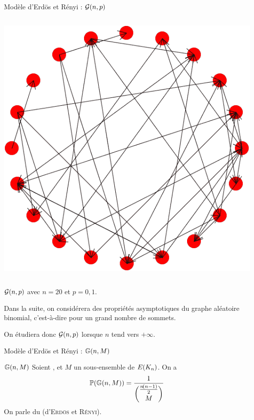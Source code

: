\documentclass[french,bookmarks]{beamer}
\newcommand{\bdG}{\mathbb{G}}
\newcommand{\bdN}{\mathbb{N}}
\newcommand{\bdP}{\mathbb{P}}
\newcommand{\bcG}{\mathcal{G}}
\begin{document}
\begin{frame}{Modèle d'Erdös et Rényi : $\bcG\p{n, p}$}
\begin{bexample}{}{}
\begin{columns}
            \centering\includegraphics[scale=0.16]{MPI - Maths/Expose/images/exG3.png}
        \end{columns}
        
        \begin{center}
            $\bcG\p{n, p}$ avec $n = 20$ et $p = 0,1$.
        \end{center}
    \end{bexample}\pause
    
    Dans la suite, on considérera des propriétés asymptotiques du graphe aléatoire binomial, c'est-à-dire pour un grand nombre de sommets.\pause
    
    \centering On étudiera donc $\bcG\p{n, p}$ lorsque $n$ tend vers $+\infty$.
\end{frame}

\begin{frame}{Modèle d'Erdös et Rényi : $\bdG\p{n, M}$}
    
    \begin{bdefinition}{$\bdG\p{n, M}$}{}
        Soient \hg{$n \in \bdN^*$}, et $M$ un sous-ensemble de $E\!\left(K_n\right)$. On a
        \[ \bdP\p{\bdG\p{n, M}} = \dfrac{1}{\dbinom{\frac{n\p{n-1}}{2}}{M}} \]
        On parle du  (d'\textsc{Erdös} et \textsc{Rényi}).
    \end{bdefinition}\pause
\end{frame}
\end{document}
